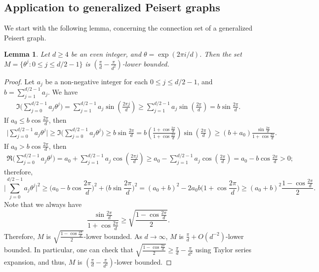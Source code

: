 \documentclass[12pt,reqno]{amsart}
\newtheorem{lem}[thm]{Lemma}
\theoremstyle{definition}
\begin{document}
\subsection{Application to generalized Peisert graphs}\label{sect:apply}

We start with the following lemma, concerning the connection set of a generalized Peisert graph.

\begin{lem}\label{GP*lem} 
Let $d \geq 4$ be an even integer, and $\theta=\exp(2\pi i/d)$. Then the set $M=\{\theta^j :0 \leq j \leq d/2-1\}$ is $\left(\frac{\pi}{d}-\frac{\pi}{d^2}\right)$-lower bounded.
\end{lem}
\begin{proof}
Let $a_j$ be a non-negative integer for each $0\leq j\leq d/2-1$, and $b=\sum_{j=1}^{d/2-1} a_j$. We have
\begin{align*}
\Im \bigg(\sum_{j=0}^{d/2-1} a_j \theta^j\bigg) =\sum_{j=1}^{d/2-1} a_j \sin\left (\frac{2\pi j}{d}\right) \geq \sum_{j=1}^{d/2-1} a_j \sin\left (\frac{2\pi}{d}\right) = b\sin \frac{2\pi}{d}.    
\end{align*}
If $a_0 \leq b \cos \frac{2\pi}{d}$, then 
\begin{align*}
\bigg|\sum_{j=0}^{d/2-1} a_j \theta^j\bigg| \geq \Im \bigg(\sum_{j=0}^{d/2-1} a_j \theta^j\bigg) \geq b\sin \frac{2\pi}{d} = b\left(\frac{1+\cos \frac{2\pi}{d}}{1+\cos \frac{2\pi}{d}}\right)\sin\left(\frac{2\pi}{d}\right)  \geq (b+a_0) \frac{\sin \frac{2\pi}{d}}{1+\cos \frac{2\pi}{d}}.
\end{align*}
If $a_0> b \cos \frac{2\pi}{d}$, then 
\begin{align*}
\Re \bigg(\sum_{j=0}^{d/2-1} a_j \theta^j\bigg) =a_0+\sum_{j=1}^{d/2-1} a_j \cos\left (\frac{2\pi j}{d}\right) \geq a_0-\sum_{j=1}^{d/2-1} a_j \cos\left (\frac{2\pi}{d}\right) = a_0-b\cos \frac{2\pi}{d}> 0;
\end{align*}
therefore, 
\[
\bigg|\sum_{j=0}^{d/2-1} a_j \theta^j\bigg|^2 \geq
\bigg(a_0-b \cos \frac{2\pi}{d}\bigg)^2+\bigg(b\sin \frac{2\pi}{d}\bigg)^2=(a_0+b)^2-2a_0b \bigg(1+\cos \frac{2\pi}{d}\bigg) \geq (a_0+b)^2 \frac{1-\cos \frac{2\pi}{d}}{2}.
\]
Note that we always have
\[
\frac{\sin \frac{2\pi}{d}}{1+\cos \frac{2\pi}{d}} \geq \sqrt{\frac{1-\cos \frac{2\pi}{d}}{2}}.
\]
Therefore, $M$ is $\sqrt{\frac{1-\cos \frac{2\pi}{d}}{2}}$-lower bounded. As $d \to \infty$, $M$ is $\frac{\pi}{d}+O(d^{-2})$-lower bounded. In particular, one can check that $\sqrt{\frac{1-\cos \frac{2\pi}{d}}{2}}\geq \frac{\pi}{d}-\frac{\pi}{d^2}$ using Taylor series expansion, and thus, $M$ is $\left(\frac{\pi}{d}-\frac{\pi}{d^2}\right)$-lower bounded.
\end{proof}
\end{document}
